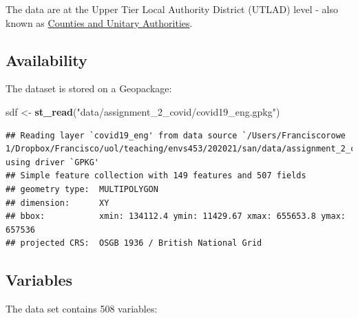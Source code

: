 \documentclass[
]{book}
\newenvironment{Shaded}{\begin{snugshade}}{\end{snugshade}}
\newcommand{\KeywordTok}[1]{\textcolor[rgb]{0.13,0.29,0.53}{\textbf{#1}}}
\newcommand{\NormalTok}[1]{#1}
\newcommand{\StringTok}[1]{\textcolor[rgb]{0.31,0.60,0.02}{#1}}
\begin{document}
The data are at the Upper Tier Local Authority District (UTLAD) level - also known as \href{https://geoportal.statistics.gov.uk/datasets/fe6bcee87d95476abc84e194fe088abb_0}{Counties and Unitary Authorities}.

\hypertarget{availability-1}{%
\subsection*{Availability}\label{availability-1}}

The dataset is stored on a Geopackage:

\begin{Shaded}
\begin{Highlighting}[]
\NormalTok{sdf <-}\StringTok{ }\KeywordTok{st_read}\NormalTok{(}\StringTok{"data/assignment_2_covid/covid19_eng.gpkg"}\NormalTok{)}
\end{Highlighting}
\end{Shaded}

\begin{verbatim}
## Reading layer `covid19_eng' from data source `/Users/Franciscorowe 1/Dropbox/Francisco/uol/teaching/envs453/202021/san/data/assignment_2_covid/covid19_eng.gpkg' using driver `GPKG'
## Simple feature collection with 149 features and 507 fields
## geometry type:  MULTIPOLYGON
## dimension:      XY
## bbox:           xmin: 134112.4 ymin: 11429.67 xmax: 655653.8 ymax: 657536
## projected CRS:  OSGB 1936 / British National Grid
\end{verbatim}

\hypertarget{variables-1}{%
\subsection*{Variables}\label{variables-1}}

The data set contains 508 variables:
\end{document}
